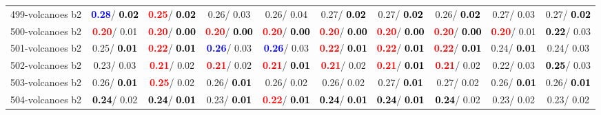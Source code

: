 \begin{table}[h]
\begin{center}
{\begin{tabular}{lc|c|c|c|c|c|c|c|c}
499-volcanoes b2 & \textcolor{blue}{\textbf{  0.28}}/\textcolor{black}{\textbf{  0.02}} & \textcolor{red}{\textbf{  0.25}}/\textcolor{black}{\textbf{  0.02}} &   0.26/  0.03 &   0.26/  0.04 &   0.27/\textcolor{black}{\textbf{  0.02}} &   0.27/\textcolor{black}{\textbf{  0.02}} &   0.26/\textcolor{black}{\textbf{  0.02}} &   0.27/  0.03 &   0.27/\textcolor{black}{\textbf{  0.02}} \\
500-volcanoes b2 & \textcolor{red}{\textbf{  0.20}}/  0.01 & \textcolor{red}{\textbf{  0.20}}/\textcolor{black}{\textbf{  0.00}} & \textcolor{red}{\textbf{  0.20}}/\textcolor{black}{\textbf{  0.00}} & \textcolor{red}{\textbf{  0.20}}/\textcolor{black}{\textbf{  0.00}} & \textcolor{red}{\textbf{  0.20}}/\textcolor{black}{\textbf{  0.00}} & \textcolor{red}{\textbf{  0.20}}/\textcolor{black}{\textbf{  0.00}} & \textcolor{red}{\textbf{  0.20}}/\textcolor{black}{\textbf{  0.00}} & \textcolor{red}{\textbf{  0.20}}/  0.01 & \textcolor{black}{\textbf{  0.22}}/  0.03 \\
501-volcanoes b2 &   0.25/\textcolor{black}{\textbf{  0.01}} & \textcolor{red}{\textbf{  0.22}}/\textcolor{black}{\textbf{  0.01}} & \textcolor{blue}{\textbf{  0.26}}/  0.03 & \textcolor{blue}{\textbf{  0.26}}/  0.03 & \textcolor{red}{\textbf{  0.22}}/\textcolor{black}{\textbf{  0.01}} & \textcolor{red}{\textbf{  0.22}}/\textcolor{black}{\textbf{  0.01}} & \textcolor{red}{\textbf{  0.22}}/\textcolor{black}{\textbf{  0.01}} &   0.24/\textcolor{black}{\textbf{  0.01}} &   0.24/  0.03 \\ \hline
502-volcanoes b2 &   0.23/  0.03 & \textcolor{red}{\textbf{  0.21}}/  0.02 & \textcolor{red}{\textbf{  0.21}}/  0.02 & \textcolor{red}{\textbf{  0.21}}/\textcolor{black}{\textbf{  0.01}} & \textcolor{red}{\textbf{  0.21}}/  0.02 & \textcolor{red}{\textbf{  0.21}}/\textcolor{black}{\textbf{  0.01}} & \textcolor{red}{\textbf{  0.21}}/  0.02 &   0.22/  0.03 & \textcolor{black}{\textbf{  0.25}}/  0.03 \\
503-volcanoes b2 &   0.26/\textcolor{black}{\textbf{  0.01}} & \textcolor{red}{\textbf{  0.25}}/  0.02 &   0.26/\textcolor{black}{\textbf{  0.01}} &   0.26/  0.02 &   0.26/  0.02 &   0.27/\textcolor{black}{\textbf{  0.01}} &   0.27/  0.02 &   0.26/\textcolor{black}{\textbf{  0.01}} &   0.26/\textcolor{black}{\textbf{  0.01}} \\
504-volcanoes b2 & \textcolor{black}{\textbf{  0.24}}/  0.02 & \textcolor{black}{\textbf{  0.24}}/\textcolor{black}{\textbf{  0.01}} &   0.23/\textcolor{black}{\textbf{  0.01}} & \textcolor{red}{\textbf{  0.22}}/\textcolor{black}{\textbf{  0.01}} & \textcolor{black}{\textbf{  0.24}}/\textcolor{black}{\textbf{  0.01}} & \textcolor{black}{\textbf{  0.24}}/\textcolor{black}{\textbf{  0.01}} & \textcolor{black}{\textbf{  0.24}}/  0.02 &   0.23/  0.02 &   0.23/  0.02 \\

\end{tabular}}
\end{center}
\end{table}

